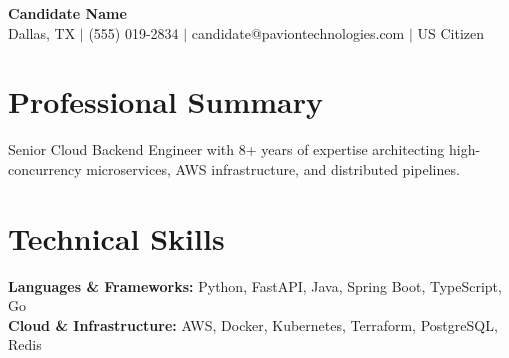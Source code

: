 \documentclass[letterpaper,10pt]{article}
\begin{document}
\begin{center}
    {\Huge \textbf{Candidate Name}} \\
    \vspace{4pt}
    Dallas, TX $|$ (555) 019-2834 $|$ candidate@paviontechnologies.com $|$ US Citizen
\end{center}

\vspace{-10pt}
\section*{Professional Summary}
Senior Cloud Backend Engineer with 8+ years of expertise architecting high-concurrency microservices, AWS infrastructure, and distributed pipelines.

\vspace{-10pt}
\section*{Technical Skills}
\textbf{Languages \& Frameworks:} Python, FastAPI, Java, Spring Boot, TypeScript, Go \\
\textbf{Cloud \& Infrastructure:} AWS, Docker, Kubernetes, Terraform, PostgreSQL, Redis
\end{document}
